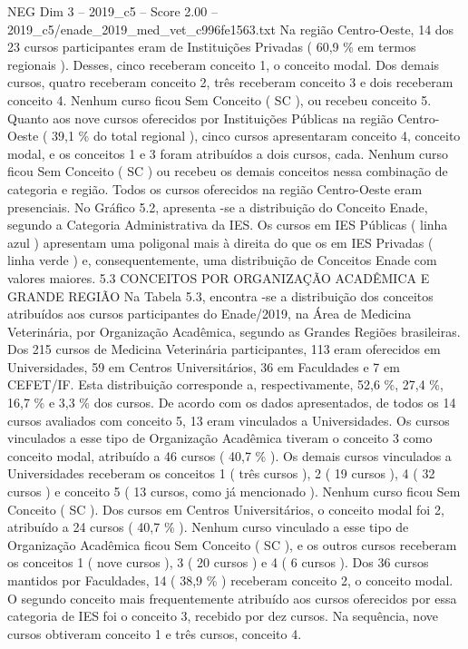 \begin{textsample}{NEG Dim 3 – 2019\_c5 – Score 2.00 – 2019\_c5/enade\_2019\_med\_vet\_c996fe1563.txt}
Na região Centro-Oeste, 14 dos 23 cursos participantes eram de Instituições Privadas ( 60,9 \% em termos regionais ).
Desses, cinco receberam conceito 1, o conceito modal.
Dos demais cursos, quatro receberam conceito 2, três receberam conceito 3 e dois receberam conceito 4.
Nenhum curso ficou Sem Conceito ( SC ), ou recebeu conceito 5.
Quanto aos nove cursos oferecidos por Instituições Públicas na região Centro-Oeste ( 39,1 \% do total regional ), cinco cursos apresentaram conceito 4, conceito modal, e os conceitos 1 e 3 foram atribuídos a dois cursos, cada.
Nenhum curso ficou Sem Conceito ( SC ) ou recebeu os demais conceitos nessa combinação de categoria e região.
Todos os cursos oferecidos na região Centro-Oeste eram presenciais.
No Gráfico 5.2, apresenta -se a distribuição do Conceito Enade, segundo a Categoria Administrativa da IES.
Os cursos em IES Públicas ( linha azul ) apresentam uma poligonal mais à direita do que os em IES Privadas ( linha verde ) e, consequentemente, uma distribuição de Conceitos Enade com valores maiores. 5.3 CONCEITOS POR ORGANIZAÇÃO ACADÊMICA E GRANDE REGIÃO Na Tabela 5.3, encontra -se a distribuição dos conceitos atribuídos aos cursos participantes do Enade/2019, na Área de Medicina Veterinária, por Organização Acadêmica, segundo as Grandes Regiões brasileiras.
Dos 215 cursos de Medicina Veterinária participantes, 113 eram oferecidos em Universidades, 59 em Centros Universitários, 36 em Faculdades e 7 em CEFET/IF.
Esta distribuição corresponde a, respectivamente, 52,6 \%, 27,4 \%, 16,7 \% e 3,3 \% dos cursos.
De acordo com os dados apresentados, de todos os 14 cursos avaliados com conceito 5, 13 eram vinculados a Universidades.
Os cursos vinculados a esse tipo de Organização Acadêmica tiveram o conceito 3 como conceito modal, atribuído a 46 cursos ( 40,7 \% ).
Os demais cursos vinculados a Universidades receberam os conceitos 1 ( três cursos ), 2 ( 19 cursos ), 4 ( 32 cursos ) e conceito 5 ( 13 cursos, como já mencionado ).
Nenhum curso ficou Sem Conceito ( SC ).
Dos cursos em Centros Universitários, o conceito modal foi 2, atribuído a 24 cursos ( 40,7 \% ).
Nenhum curso vinculado a esse tipo de Organização Acadêmica ficou Sem Conceito ( SC ), e os outros cursos receberam os conceitos 1 ( nove cursos ), 3 ( 20 cursos ) e 4 ( 6 cursos ).
Dos 36 cursos mantidos por Faculdades, 14 ( 38,9 \% ) receberam conceito 2, o conceito modal.
O segundo conceito mais frequentemente atribuído aos cursos oferecidos por essa categoria de IES foi o conceito 3, recebido por dez cursos.
Na sequência, nove cursos obtiveram conceito 1 e três cursos, conceito 4.

\end{textsample}
